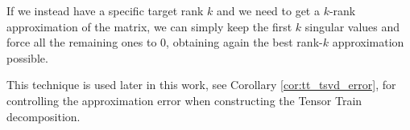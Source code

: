 If we instead have a specific target rank $k$ and we need to get a $k$-rank approximation of the matrix, we can simply keep the first $k$ singular values and force all the remaining ones to $0$, obtaining again the best rank-$k$ approximation possible.

This technique is used later in this work, see Corollary \ref{cor:tt_tsvd_error}, for controlling the approximation error when constructing the Tensor Train decomposition.
